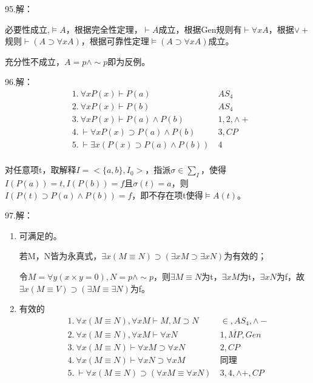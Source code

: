 \documentclass[a4paper]{ctexart}
\begin{document}
\noindent 95.解：

必要性成立,$\models A$，根据完全性定理，$\vdash A$成立，根据Gen规则有$\vdash\forall{x}A$，根据$\vee+$规则$\vdash(A\supset\forall{x}A)$，根据可靠性定理$\models(A\supset\forall{x}A)$成立。

充分性不成立，$A=p\wedge\sim p$即为反例。\newline

\noindent 96.解：
\begin{align*}
  &1.\ \forall{x}P(x)\vdash P(a) \ &AS_4\\
  &2.\ \forall{x}P(x)\vdash P(b) \ &AS_4\\
  &3.\ \forall{x}P(x)\vdash P(a)\wedge P(b) \ &1,2,\wedge+\\
  &4.\ \vdash\forall{x}P(x)\supset P(a)\wedge P(b) \ &3,CP\\
  &5.\ \vdash\exists{x}(P(x)\supset P(a)\wedge P(b)) \ &4\\
\end{align*}

对任意项t，取解释$I=<\{a,b\},I_0>$，指派$\sigma\in \sum_I$，使得$I(P(a))=t,I(P(b))=f$且$\sigma(t)=a$，则$I(P(t)\supset P(a)\wedge P(b))=f$，即不存在项t使得$\models A(t)$。\newline

\noindent 97.解：
\begin{enumerate}
  \item 可满足的。
  
  若M，N皆为永真式，$\exists{x}(M\equiv N)\supset(\exists{x}M\supset\exists{x}N)$为有效的；
  
  令$M=\forall{y}(x\times y=0),N=p\wedge\sim p$，则$\exists{M\equiv N}$为t，$\exists{x}M$为t，$\exists{x}N$为f，故$\exists{x}(M\equiv V)\supset(\exists{M}\equiv\exists{N})$为f。
  
  \item 有效的
  \begin{align*}
    &1.\ \forall{x}(M\equiv N),\forall{x}M\vdash M,M\supset N \ &\in,AS_4,\wedge- \\
    &2.\ \forall{x}(M\equiv N),\forall{x}M\vdash \forall{x}N \ &1,\overline{MP},Gen\\
    &3.\ \forall{x}(M\equiv N)\vdash \forall{x}M\supset\forall{x}N \ &2,CP\\
    &4.\ \forall{x}(M\equiv N)\vdash \forall{x}N\supset\forall{x}M \ &\text{同理}\\
    &5.\ \vdash \forall{x}(M\equiv N)\supset(\forall{x}M\equiv\forall{x}N) \ &3,4,\wedge+,CP
  \end{align*}
\end{enumerate}
\end{document}

